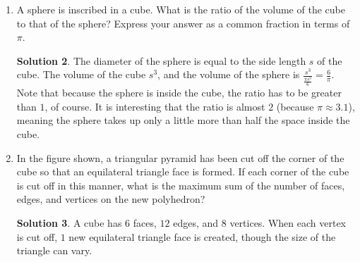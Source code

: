 \documentclass{article}
\theoremstyle{definition}
\newtheorem*{solution}{Solution}
\begin{document}
\begin{multicols}{2}
\begin{enumerate}
\begin{solution}
                When the net is folded into a three-dimensional octahedron, two hexagons and one square meet at each vertex.
                Thus, the number of vertices on the solid is $\frac{72}{3} = 24$ vertices.
                Alternatively, since each vertex of the solid is a vertex of exactly one square, it is sufficient to count just the vertices of the $64$ squares.
                Doing so yields a total of $4 \cdot 6 = 24$ vertices for the solid.
            \end{solution}
        \item A sphere is inscribed in a cube.
            What is the ratio of the volume of the cube to that of the sphere?
            Express your answer as a common fraction in terms of $\pi$.
            \begin{solution}
                The diameter of the sphere is equal to the side length $s$ of the cube.
                The volume of the cube $s^3$, and the volume of the sphere is $\frac{s^3}{\frac{\pi s^3}{6}} = \frac{6}{\pi}$.
                Note that because the sphere is inside the cube, the ratio has to be greater than $1$, of course.
                It is interesting that the ratio is almost $2$ (because $\pi \approx 3.1$), meaning the sphere takes up only a little more than half the space inside the cube.
            \end{solution}
        \item In the figure shown, a triangular pyramid has been cut off the corner of the cube so that an equilateral triangle face is formed.
            If each corner of the cube is cut off in this manner, what is the maximum sum of the number of faces, edges, and vertices on the new polyhedron?
            \begin{center}
            \end{center}
            \begin{solution}
                A cube has $6$ faces, $12$ edges, and $8$ vertices. When each vertex is cut off, $1$ new equilateral triangle face is created, though the size of the triangle can vary.

\end{solution}
\end{enumerate}
\end{multicols}
\end{document}

